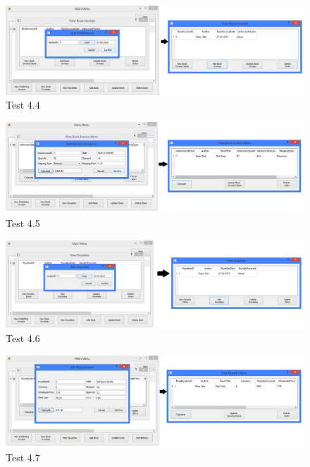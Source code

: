 \begin{landscape}
\begin{figure}[H]
    \includegraphics[width=\textwidth]{./Testing/Evidence/Series4/AddBookInvoiceTest.png}
    \caption{Test 4.4}  \label{fig:AddBookInvoiceTest}
\end{figure}

\begin{figure}[H]
    \includegraphics[width=\textwidth]{./Testing/Evidence/Series4/AddBookInvoiceItemsTest.png}
    \caption{Test 4.5}  \label{fig:AddBookInvoiceItemsTest}
\end{figure}

\begin{figure}[H]
    \includegraphics[width=\textwidth]{./Testing/Evidence/Series4/AddRoyaltiesTest.png}
    \caption{Test 4.6}  \label{fig:AddRoyaltiesTest}
\end{figure}

\begin{figure}[H]
    \includegraphics[width=\textwidth]{./Testing/Evidence/Series4/AddRoyaltyItemsTest.png}
    \caption{Test 4.7}  \label{fig:AddRoyaltyItemsTest}
\end{figure}


\end{landscape}
